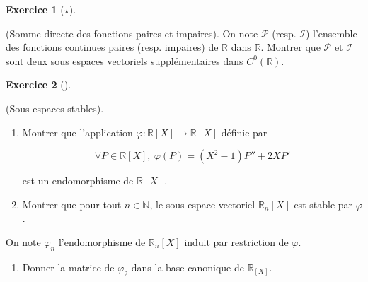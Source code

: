 \documentclass[
  french,
  letterpaper,
  DIV=11,
  numbers=noendperiod]{scrreprt}
\providecommand{\tightlist}{%
  \setlength{\itemsep}{0pt}\setlength{\parskip}{0pt}}
\theoremstyle{plain}
\theoremstyle{definition}
\theoremstyle{plain}
\theoremstyle{plain}
\theoremstyle{definition}
\newtheorem{exercise}{Exercice}[chapter]
\theoremstyle{definition}
\theoremstyle{plain}
\theoremstyle{remark}
\begin{document}
\begin{exercise}[\(\star\)]\protect\hypertarget{exr-03-an-synt-2}{}\label{exr-03-an-synt-2}

(Somme directe des fonctions paires et impaires). On note
\(\mathcal{P}\) (resp. \(\mathcal{I}\)) l'ensemble des fonctions
continues paires (resp. impaires) de \(\mathbb{R}\) dans \(\mathbb{R}\).
Montrer que \(\mathcal{P}\) et \(\mathcal{I}\) sont deux sous espaces
vectoriels supplémentaires dans \(C^{0}(\mathbb{R})\).

\end{exercise}

\begin{exercise}[]\protect\hypertarget{exr-03-stabilite}{}\label{exr-03-stabilite}

(Sous espaces stables).

\begin{enumerate}
\def\labelenumi{\arabic{enumi}.}
\item
  Montrer que l'application \(\varphi :\mathbb{R}[X] \to \mathbb{R}[X]\)
  définie par

  \[
   \forall P \in \mathbb{R}[X],\ \varphi(P) = (X^{2}-1)P'' + 2XP' 
   \]

  est un endomorphisme de \(\mathbb{R}[X]\).
\item
  Montrer que pour tout \(n \in \mathbb{N}\), le sous-espace vectoriel
  \(\mathbb{R}_{n}[X]\) est stable par \(\varphi\).
\end{enumerate}

On note \(\varphi_{n}\) l'endomorphisme de \(\mathbb{R}_{n}[X]\) induit
par restriction de \(\varphi\).

\begin{enumerate}
\def\labelenumi{\arabic{enumi}.}
\setcounter{enumi}{2}
\tightlist
\item
  Donner la matrice de \(\varphi_{2}\) dans la base canonique de
  \(\mathbb{R}_[X]\).
\end{enumerate}

\end{exercise}
\end{document}

